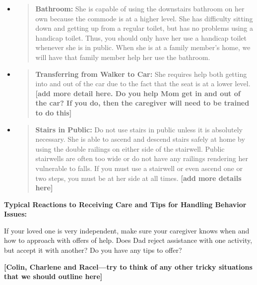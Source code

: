 \documentclass[]{article}
\begin{document}
\begin{itemize}
\item
  \begin{quote}
  \textbf{Bathroom:} She is capable of using the downstairs bathroom on
  her own because the commode is at a higher level. She has difficulty
  sitting down and getting up from a regular toilet, but has no problems
  using a handicap toilet. Thus, you should only have her use a handicap
  toilet whenever she is in public. When she is at a family member's
  home, we will have that family member help her use the bathroom.
  \end{quote}
\end{itemize}

\begin{itemize}
\item
  \begin{quote}
  \textbf{Transferring from Walker to Car:} She requires help both
  getting into and out of the car due to the fact that the seat is at a
  lower level. \textbf{{[}add more detail here. Do you help Mom get in
  and out of the car? If you do, then the caregiver will need to be
  trained to do this{]}}
  \end{quote}
\end{itemize}

\begin{itemize}
\item
  \begin{quote}
  \textbf{Stairs in Public:} Do not use stairs in public unless it is
  absolutely necessary. She is able to ascend and descend stairs safely
  at home by using the double railings on either side of the stairwell.
  Public stairwells are often too wide or do not have any railings
  rendering her vulnerable to falls. If you must use a stairwell or even
  ascend one or two steps, you must be at her side at all times.
  \textbf{{[}add more details here{]}}
  \end{quote}
\end{itemize}

\textbf{Typical Reactions to Receiving Care and Tips for Handling
Behavior Issues:}

If your loved one is very independent, make sure your caregiver knows
when and how to approach with offers of help. Does Dad reject assistance
with one activity, but accept it with another? Do you have any tips to
offer?

\textbf{{[}Colin, Charlene and Racel---try to think of any other tricky
situations that we should outline here{]}}
\end{document}
